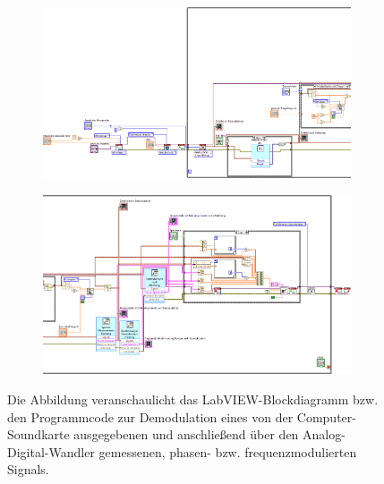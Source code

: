 \documentclass[
a4paper,
12pt,
pagesize,
ngerman
]{scrartcl}
\begin{document}
	\begin{figure}[H]
		\centering
		\begin{subfigure}[t]{1.0\textwidth}
			\centering
			\includegraphics[width=1.0\textwidth]{EIRE2018Dateien/Tag4/OsziFMPM-Demod/FM/OsziPlusFMPMdTeil1}
		\end{subfigure}
		
		\vspace{0,2cm}
		
		\begin{subfigure}[t]{0.95\textwidth}
			\centering
			\includegraphics[width=1.0\textwidth]{EIRE2018Dateien/Tag4/OsziFMPM-Demod/FM/OsziPlusFMPMdTeil2}
		\end{subfigure}
		\caption{Die Abbildung veranschaulicht das LabVIEW-Blockdiagramm bzw. den Programmcode zur Demodulation eines von der Computer-Soundkarte ausgegebenen und anschließend über den Analog-Digital-Wandler gemessenen, phasen- bzw. frequenzmodulierten Signals.}
		\label{FMPMDemodProgrammcode1}
	\end{figure}
	
	
\end{document}
